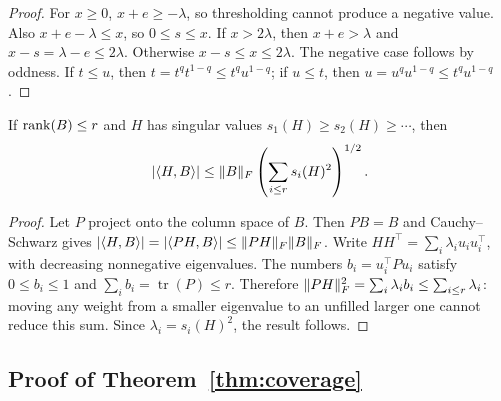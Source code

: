 \begin{proof}
For $x\ge0$, $x+e\ge-\lambda$, so thresholding cannot produce a negative value. Also $x+e-\lambda\le x$, so $0\le s\le x$. If $x>2\lambda$, then $x+e>\lambda$ and $x-s=\lambda-e\le2\lambda$. Otherwise $x-s\le x\le2\lambda$. The negative case follows by oddness. If $t\le u$, then $t=t^q t^{1-q}\le t^q u^{1-q}$; if $u\le t$, then $u=u^q u^{1-q}\le t^q u^{1-q}$.
\end{proof}

\begin{lemma}\label{lem:structural}
If $\operatorname{rank}(B)\le r$ and $H$ has singular values $s_1(H)\ge s_2(H)\ge\cdots$, then
\[
 |\langle H,B\rangle|\le\lVert B\rVert_F\left(\sum_{i\le r}s_i(H)^2\right)^{1/2}.
\]
\end{lemma}

\begin{proof}
Let $P$ project onto the column space of $B$. Then $PB=B$ and Cauchy--Schwarz gives $|\langle H,B\rangle|=|\langle PH,B\rangle|\le\lVert PH\rVert_F\lVert B\rVert_F$. Write $HH^\top=\sum_i\lambda_i u_i u_i^\top$, with decreasing nonnegative eigenvalues. The numbers $b_i=u_i^\top P u_i$ satisfy $0\le b_i\le1$ and $\sum_i b_i=\operatorname{tr}(P)\le r$. Therefore $\lVert PH\rVert_F^2=\sum_i\lambda_i b_i\le\sum_{i\le r}\lambda_i$: moving any weight from a smaller eigenvalue to an unfilled larger one cannot reduce this sum. Since $\lambda_i=s_i(H)^2$, the result follows.
\end{proof}

\subsection{Proof of Theorem~\ref{thm:coverage}}

